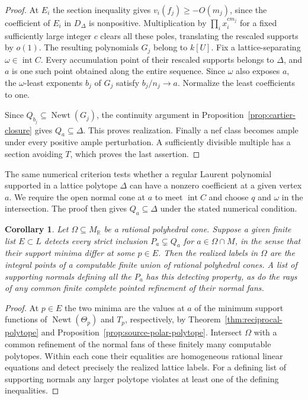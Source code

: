 \documentclass[11pt,reqno]{amsart}
\numberwithin{equation}{section}
\newtheorem{corollary}[theorem]{Corollary}
\theoremstyle{definition}
\theoremstyle{remark}
\DeclareMathOperator{\Newt}{Newt}
\begin{document}
\begin{proof}
At \(E_i\) the section inequality gives \(v_i(f_j)\ge-O(m_j)\),
since the coefficient of \(E_i\) in \(D_\Delta\) is nonpositive.
Multiplication by \(\prod_i x_i^{c m_j}\) for a fixed sufficiently
large integer \(c\) clears all these poles, translating the rescaled
supports by \(o(1)\). The resulting polynomials \(G_j\) belong to
\(k[U]\). Fix a lattice-separating \(\omega\in\operatorname{int}C\).
Every accumulation point of their rescaled supports belongs to
\(\Delta\), and \(a\) is one such point obtained along the entire
sequence. Since \(\omega\) also exposes \(a\), the
\(\omega\)-least exponents \(b_j\) of \(G_j\) satisfy \(b_j/n_j\to a\).
Normalize the least coefficients to one.

Since \(Q_{b_j}\subseteq\Newt(G_j)\), the continuity argument in
Proposition~\ref{prop:cartier-closure} gives \(Q_a\subseteq\Delta\).
This proves realization. Finally a nef class becomes ample
under every positive ample perturbation. A sufficiently divisible
multiple has a section avoiding \(T\), which proves the last assertion.
\end{proof}

The same numerical criterion tests whether a regular Laurent polynomial
supported in a lattice polytope \(\Delta\) can have a nonzero
coefficient at a given vertex \(a\). We require the open normal cone
at \(a\) to meet \(\operatorname{int}C\) and choose \(q\) and \(\omega\)
in the intersection. The proof then gives \(Q_a\subseteq\Delta\)
under the stated numerical condition.

\begin{corollary}\label{cor:uniform-divisor-realization}
Let \(\Omega\subseteq M_{\mathbb R}\) be a rational polyhedral cone.
Suppose a given finite list \(E\subset L\) detects every strict
inclusion \(P_a\subsetneq Q_a\) for \(a\in\Omega\cap M\), in the
sense that their support minima differ at some \(p\in E\).
Then the realized labels in \(\Omega\) are the integral points of a
computable finite union of rational polyhedral cones. A list of
supporting normals defining all the \(P_a\) has this detecting
property, as do the rays of any common finite complete pointed refinement
of their normal fans.
\end{corollary}
\begin{proof}
At \(p\in E\) the two minima are the values at \(a\) of the minimum
support functions of \(\Newt(\Theta_p)\) and \(T_p\), respectively,
by Theorem~\ref{thm:reciprocal-polytope} and
Proposition~\ref{prop:source-polar-polytope}. Intersect \(\Omega\)
with a common refinement of the normal fans of these finitely many
computable polytopes. Within each cone their equalities are homogeneous
rational linear equations and detect precisely the realized lattice
labels. For a defining list of supporting normals any larger polytope
violates at least one of the defining inequalities.
\end{proof}
\end{document}
